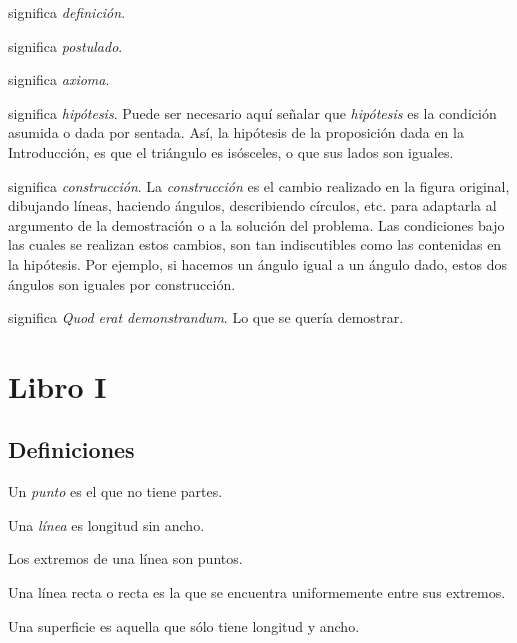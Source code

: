 \documentclass[booklanguage=english]{byrnebook}
\begin{document}
\symb{\indefstr}
 significa \emph{definición}.

\symb{\inpoststr}
 significa \emph{postulado}.

\symb{\inaxstr}
 significa \emph{axioma}.

 significa \emph{hipótesis}. Puede ser necesario aquí señalar que \emph{hipótesis} es la condición asumida o dada por sentada. Así, la hipótesis de la proposición dada en la Introducción, es que el triángulo es isósceles, o que sus lados son iguales.

\symb{\conststr}
 significa \emph{construcción}. La \emph{construcción} es el cambio realizado en la figura original, dibujando líneas, haciendo ángulos, describiendo círculos, etc. para adaptarla al argumento de la demostración o a la solución del problema. Las condiciones bajo las cuales se realizan estos cambios, son tan indiscutibles como las contenidas en la hipótesis. Por ejemplo, si hacemos un ángulo igual a un ángulo dado, estos dos ángulos son iguales por construcción.

\symb{\qedstr}
significa \emph{Quod erat demonstrandum}. Lo que se quería demostrar.

\part{Libro I}

\chapter*{Definiciones}

\startdefinition{}\label{def:I.I}
\begin{center}
Un \emph{punto} es el que no tiene partes.
\end{center}

\startdefinition{}\label{def:I.II}
\begin{center}
Una \emph{línea} es longitud sin ancho.
\end{center}

\startdefinition{}\label{def:I.III}
\begin{center}
Los extremos de una línea son puntos.
\end{center}

\startdefinition{}\label{def:I.IV}
\begin{center}
Una línea recta o recta es la que se encuentra uniformemente entre sus extremos.
\end{center}

\startdefinition{}\label{def:I.V}
\begin{center}
Una superficie es aquella que sólo tiene longitud y ancho.
\end{center}
\end{document}
